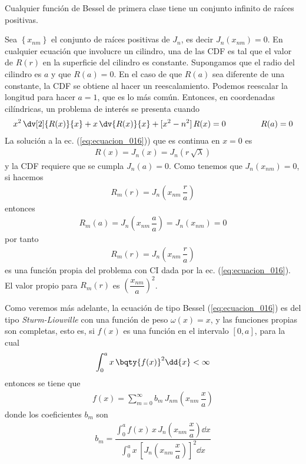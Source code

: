 Cualquier función de Bessel de primera clase tiene un conjunto infinito de raíces positivas.
\par
Sea $ \left\{ x_{nm} \right\}$ el conjunto de raíces positivas de $J_{n}$, es decir $J_{n}(x_{nm}) = 0$. En cualquier ecuación que involucre un cilindro, una de las CDF es tal que el valor de $R(r)$ en la superficie del cilindro es constante. Supongamos que el radio del cilindro es $a$ y que $R(a) = 0$. En el caso de que $R(a)$ sea diferente de una constante, la CDF se obtiene al hacer un reescalamiento. Podemos reescalar la longitud para hacer $a = 1$, que es lo más común. Entonces, en coordenadas cilíndricas, un problema de interés se presenta cuando
\begin{align}
x^{2} \, \dv[2]{R(x)}{x} + x \, \dv{R(x)}{x} + [x^{2} - n^{2}] \, R(x) = 0 \hspace{1.5cm} R(a) = 0
\label{eq:ecuacion_016}
\end{align}
La solución a la ec. (\ref{eq:ecuacion_016})) que es continua en $x = 0$ es
\begin{align*}
R(x) = J_{n} (x) = J_{n} (r \, \sqrt{\lambda})
\end{align*}
y la CDF requiere que se cumpla $J_{n}(a) = 0$. Como tenemos que $J_{n}(x_{nm}) = 0$, si hacemos
\begin{align*}
R_{m}(r) = J_{n} \left( x_{nm} \, \dfrac{r}{a} \right)
\end{align*}
entonces
\begin{align*}
R_{m} (a) = J_{n} \left( x_{nm} \, \dfrac{a}{a} \right) = J_{n} (x_{nm}) = 0
\end{align*}
por tanto
\begin{align*}
R_{m} (r) = J_{n} \left( x_{nm} \, \dfrac{r}{a} \right)
\end{align*}
es una función propia del problema con CI dada por la ec. (\ref{eq:ecuacion_016}). El valor propio para $R_{m}(r)$ es $\left( \dfrac{x_{nm}}{a} \right)^{2}$.
\par
Como veremos más adelante, la ecuación de tipo Bessel (\ref{eq:ecuacion_016}) es del tipo \emph{Sturm-Liouville} con una función de peso $\omega (x) = x$, y las funciones propias son completas, esto es, si $f(x)$ es una función en el intervalo $[0, a]$, para la cual
\begin{align*}
\int_{0}^{a} x \, \bqty{ f(x) }^{2} \dd{x} < \infty
\end{align*}
entonces se tiene que
\begin{align*}
f(x) = \sum_{m=0}^{\infty} b_{m} \, J_{nm} \left( x_{nm} \, \dfrac{x}{a} \right)
\end{align*}
donde los coeficientes $b_{m}$ son
\begin{align*}
b_{m} = \dfrac{\displaystyle \int_{0}^{a} f(x) \, x \, J_{n} \left( x_{nm} \, \dfrac{x}{a} \right) \dd{x}}{\displaystyle \int_{0}^{a} x \, \left[ J_{n} \left( x_{nm} \, \dfrac{x}{a} \right) \right]^{2} \dd{x}}
\end{align*}
